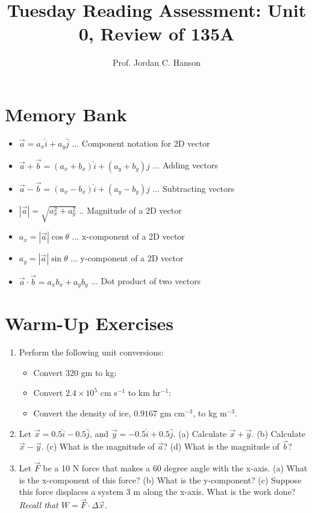 \documentclass{article}
\begin{document}
\title{Tuesday Reading Assessment: Unit 0, Review of 135A}
\author{Prof. Jordan C. Hanson}

\maketitle

\section{Memory Bank}

\begin{itemize}
\item $\vec{a} = a_x \hat{i} + a_y \hat{j}$ ... Component notation for 2D vector
\item $\vec{a} + \vec{b} = (a_x + b_x)\hat{i} + (a_y + b_y)\hat{j}$ ... Adding vectors
\item $\vec{a} - \vec{b} = (a_x - b_x)\hat{i} + (a_y - b_y)\hat{j}$ ... Subtracting vectors
\item $|\vec{a}| = \sqrt{a_x^2 + a_y^2}$ .. Magnitude of a 2D vector
\item $a_x = |\vec{a}|\cos\theta$ ... x-component of a 2D vector
\item $a_y = |\vec{a}|\sin\theta$ ... y-component of a 2D vector
\item $\vec{a} \cdot \vec{b} = a_x b_x + a_y b_y$ ... Dot product of two vectors
\end{itemize}

\section{Warm-Up Exercises}

\begin{enumerate}
\item Perform the following unit conversions:
\begin{itemize}
\item Convert 320 gm to kg:
\item Convert $2.4 \times 10^{5}$ cm s$^{-1}$ to km hr$^{-1}$:
\item Convert the density of ice, $0.9167$ gm cm$^{-3}$, to kg m$^{-3}$. \\ \vspace{0.5cm}
\end{itemize}
\item Let $\vec{x} = 0.5 \hat{i} - 0.5\hat{j}$, and $\vec{y} = -0.5\hat{i} + 0.5\hat{j}$. (a) Calculate $\vec{x} + \vec{y}$.  (b) Calculate $\vec{x} - \vec{y}$. (c) What is the magnitude of $\vec{a}$? (d) What is the magnitude of $\vec{b}$? \\ \vspace{2cm}
\item Let $\vec{F}$ be a 10 N force that makes a 60 degree angle with the x-axis. (a) What is the x-component of this force? (b) What is the y-component? (c) Suppose this force displaces a system 3 m along the x-axis.  What is the work done?  \textit{Recall that $W = \vec{F} \cdot \Delta \vec{x}$.}
\end{enumerate}
\end{document}
